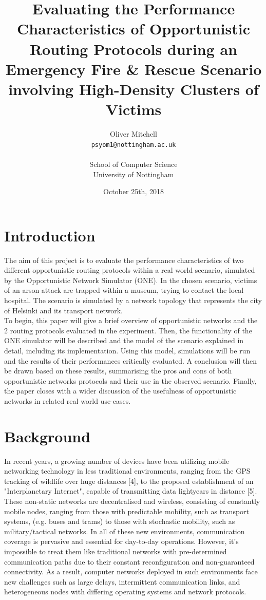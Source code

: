 \documentclass{article}
\title{Evaluating the Performance Characteristics of Opportunistic Routing Protocols during an Emergency Fire \& Rescue Scenario involving High-Density Clusters of Victims}
\author{
  Oliver Mitchell\\
  \texttt{psyom1@nottingham.ac.uk}\\\\
  \textnormal{School of Computer Science}\\
  \textnormal{University of Nottingham}
}
\date{October 25th, 2018}
\begin{document}
\maketitle
 
\tableofcontents
\newpage

\section{Introduction}
The aim of this project is to evaluate the performance characteristics of two different opportunistic routing protocols within a real world scenario, simulated by the Opportunistic Network Simulator (ONE). In the chosen scenario, victims of an arson attack are trapped within a museum, trying to contact the local hospital. The scenario is simulated by a network topology that represents the city of Helsinki and its transport network.\\
\newline
To begin, this paper will give a brief overview of opportunistic networks and the 2 routing protocols evaluated in the experiment. Then, the functionality of the ONE simulator will be described and the model of the scenario explained in detail, including its implementation. Using this model, simulations will be run and the results of their performances critically evaluated. A conclusion will then be drawn based on these results, summarising the pros and cons of both opportunistic networks protocols and their use in the observed scenario. Finally, the paper closes with a wider discussion of the usefulness of opportunistic networks in related real world use-cases.

\section{Background}
In recent years, a growing number of devices have been utilizing mobile networking technology in less traditional environments, ranging from the GPS tracking of wildlife over huge distances [4], to the proposed establishment of an "Interplanetary Internet", capable of transmitting data lightyears in distance [5]. These non-static networks are decentralised and wireless, consisting of constantly mobile nodes, ranging from those with predictable mobility, such as transport systems, (e.g. buses and trams) to those with stochastic mobility, such as military/tactical networks. In all of these new environments, communication coverage is pervasive and essential for day-to-day operations. However, it's impossible to treat them like traditional networks with pre-determined communication paths due to their constant reconfiguration and non-guaranteed connectivity. As a result, computer networks deployed in such environments face new challenges such as large delays, intermittent communication links, and heterogeneous nodes with differing operating systems and network protocols.
\end{document}
